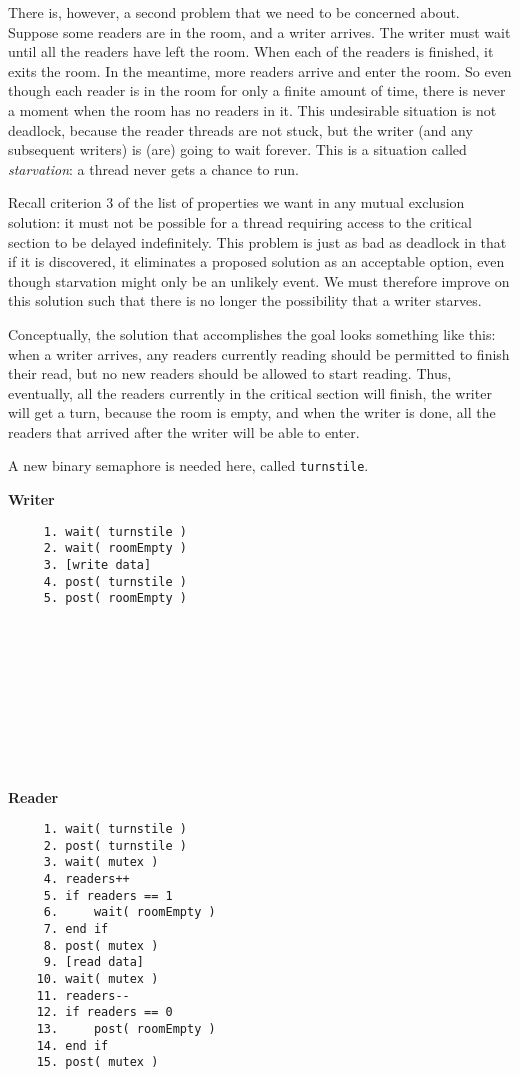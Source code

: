There is, however, a second problem that we need to be concerned about. Suppose some readers are in the room, and a writer arrives. The writer must wait until all the readers have left the room. When each of the readers is finished, it exits the room. In the meantime, more readers arrive and enter the room. So even though each reader is in the room for only a finite amount of time, there is never a moment when the room has no readers in it. This undesirable situation is not deadlock, because the reader threads are not stuck, but the writer (and any subsequent writers) is (are) going to wait forever. This is a situation called \textit{starvation}: a thread never gets a chance to run.

Recall criterion 3 of the list of properties we want in any mutual exclusion solution: it must not be possible for a thread requiring access to the critical section to be delayed indefinitely. This problem is just as bad as deadlock in that if it is discovered, it eliminates a proposed solution as an acceptable option, even though starvation might only be an unlikely event. We must therefore improve on this solution such that there is no longer the possibility that a writer starves.

Conceptually, the solution that accomplishes the goal looks something like this: when a writer arrives, any readers currently reading should be permitted to finish their read, but no new readers should be allowed to start reading. Thus, eventually, all the readers currently in the critical section will finish, the writer will get a turn, because the room is empty, and when the writer is done, all the readers that arrived after the writer will be able to enter.

A new binary semaphore is needed here, called \texttt{turnstile}. 

\begin{multicols}{2}
\textbf{Writer}\vspace{-2em}
  \begin{verbatim}
	 1. wait( turnstile )
	 2. wait( roomEmpty )
	 3. [write data]
	 4. post( turnstile )
	 5. post( roomEmpty )
	 
	 
	 
	 
	 
	 
	 
	 
	 
	 
  \end{verbatim}
\columnbreak
\textbf{Reader}\vspace{-2em}
  \begin{verbatim}
	 1. wait( turnstile )
	 2. post( turnstile )
	 3. wait( mutex )
	 4. readers++
	 5. if readers == 1
	 6.     wait( roomEmpty )
	 7. end if
	 8. post( mutex )
	 9. [read data]
	10. wait( mutex )
	11. readers--
	12. if readers == 0
	13.     post( roomEmpty )
	14. end if
	15. post( mutex )
  \end{verbatim}
\end{multicols}
\vspace{-2em}

